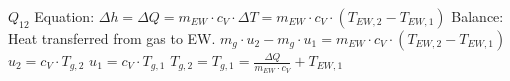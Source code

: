 \( Q_{12} \)  
Equation: \( \Delta h = \Delta Q = m_{EW} \cdot c_V \cdot \Delta T = m_{EW} \cdot c_V \cdot (T_{EW,2} - T_{EW,1}) \)  
Balance: Heat transferred from gas to EW.  
\( m_g \cdot u_2 - m_g \cdot u_1 = m_{EW} \cdot c_V \cdot (T_{EW,2} - T_{EW,1}) \)  
\( u_2 = c_V \cdot T_{g,2} \)  
\( u_1 = c_V \cdot T_{g,1} \)  
\( T_{g,2} = T_{g,1} = \frac{\Delta Q}{m_{EW} \cdot c_V} + T_{EW,1} \)
